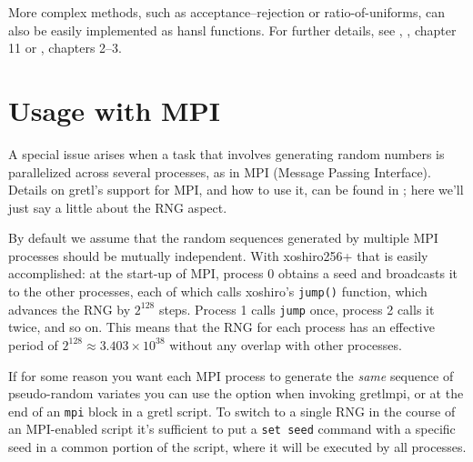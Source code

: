 
More complex methods, such as acceptance--rejection or
ratio-of-uniforms, can also be easily implemented as hansl
functions. For further details, see \cite{Gentle2004},
\cite{Monahan2001}, chapter 11 or \cite{Tanizaki2004}, chapters 2--3.

\section{Usage with MPI}
\label{sec:mpi}

A special issue arises when a task that involves generating random
numbers is parallelized across several processes, as in \textsf{MPI}
(Message Passing Interface). Details on gretl's support for
\textsf{MPI}, and how to use it, can be found in \cite{cottrell-mpi};
here we'll just say a little about the RNG aspect.

By default we assume that the random sequences generated by multiple MPI
processes should be mutually independent. With \textsf{xoshiro256+} that
is easily accomplished: at the start-up of MPI, process 0 obtains a seed
and broadcasts it to the other processes, each of which calls
\textsf{xoshiro}'s \texttt{jump()} function, which advances the RNG by
$2^{128}$ steps. Process 1 calls \texttt{jump} once, process 2 calls it
twice, and so on. This means that the RNG for each process has an
effective period of $2^{128} \approx 3.403 \times 10^{38}$ without any
overlap with other processes.

If for some reason you want each MPI process to generate the
\textit{same} sequence of pseudo-random variates you can use the
 option when invoking \textsf{gretlmpi}, or at the
end of an \texttt{mpi} block in a gretl script. To switch to a single
RNG in the course of an MPI-enabled script it's sufficient to put a
\texttt{set seed} command with a specific seed in a common portion of
the script, where it will be executed by all processes.

